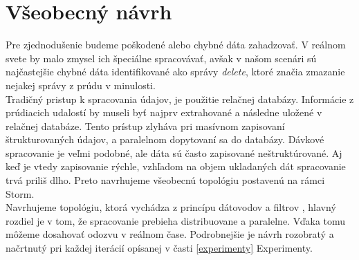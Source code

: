 \section{Všeobecný návrh}
Pre zjednodušenie budeme poškodené alebo chybné dáta zahadzovať. V reálnom svete by malo zmysel ich špeciálne spracovávať, avšak v našom scenári sú najčastejšie chybné dáta identifikované ako správy \textit{delete}, ktoré značia zmazanie nejakej správy z prúdu v minulosti. 
\\[5pt]
Tradičný pristup k spracovania údajov, je použitie relačnej databázy. Informácie z prúdiacich udalostí by museli byť najprv extrahované a následne uložené v relačnej databáze. Tento prístup zlyháva pri masívnom zapisovaní štrukturovaných údajov, a paralelnom dopytovaní sa do databázy. Dávkové spracovanie je veľmi podobné, ale dáta sú často zapisované neštruktúrované. Aj keď je vtedy zapisovanie rýchle, vzhľadom na objem ukladaných dát spracovanie trvá priliš dlho. Preto navrhujeme všeobecnú topológiu postavenú na rámci Storm. 
\\[5pt]
Navrhujeme topológiu, ktorá vychádza z princípu dátovodov a filtrov \citep{aggarwal2007data}, hlavný rozdiel je v tom, že spracovanie prebieha distribuovane a paralelne. Vďaka tomu môžeme dosahovať odozvu v reálnom čase. Podrobnejšie je návrh rozobratý a načrtnutý pri každej iterácií opísanej v časti \ref{experimenty} Experimenty.
{} 




